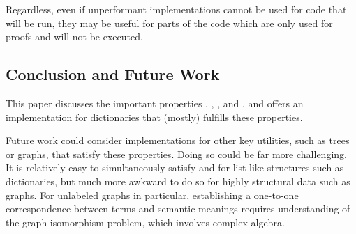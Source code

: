 Regardless, even if unperformant implementations
%
cannot be used for code that will be run, they may be useful for parts of the code which are only used for proofs and will not be executed.


\subsection{Conclusion and Future Work}
%
This paper discusses the important properties \SemTot, \SemInj, \EqDec, and \EzDstr, and offers an implementation for dictionaries that (mostly) fulfills these properties.

Future work could consider implementations for other key utilities, such as trees or graphs, that satisfy these properties.
%
Doing so could be far more challenging.
%
It is relatively easy to simultaneously satisfy \SemTot{} and \SemInj{} for list-like structures such as dictionaries,
%
but much more awkward to do so for highly structural data such as graphs. For unlabeled graphs in particular, establishing a one-to-one correspondence between terms and
%
semantic meanings requires understanding of the graph isomorphism problem, which involves complex algebra.

